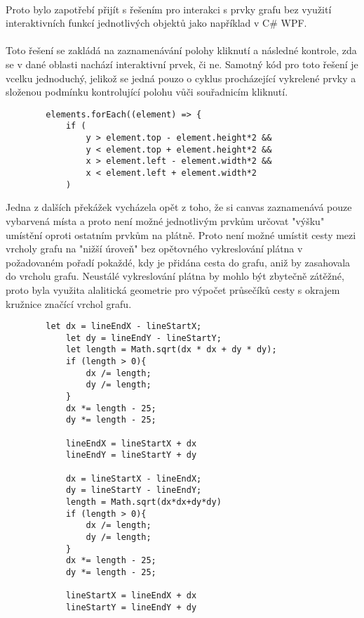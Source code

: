 \documentclass[12pt, titlepage, a4paper]{article}
\begin{document}
\paragraph{}
Proto bylo zapotřebí přijít s řešením pro interakci s prvky grafu bez využití
interaktivních funkcí jednotlivých objektů jako například v C\# WPF. \par
\paragraph{}
Toto řešení se zakládá na zaznamenávání polohy kliknutí a následné kontrole, zda
se v dané oblasti nachází interaktivní prvek, či ne. Samotný kód pro toto řešení
je vcelku jednoduchý, jelikož se jedná pouzo o cyklus procházející vykrelené prvky
a složenou podmínku kontrolující polohu vůči souřadnicím kliknutí. \par
\begin{lstlisting}
        elements.forEach((element) => {
            if (
                y > element.top - element.height*2 &&
                y < element.top + element.height*2 &&
                x > element.left - element.width*2 &&
                x < element.left + element.width*2
            )
    \end{lstlisting}

Jedna z dalších překážek vycházela opět z toho, že si canvas zaznamenává pouze
vybarvená místa a proto není možné jednotlivým prvkům určovat "výšku" \\ umístění
oproti ostatním prvkům na plátně. Proto není možné umístit cesty mezi vrcholy
grafu na "nižší úroveň" bez opětovného vykreslování plátna v požadovaném pořadí
pokaždé, kdy je přidána cesta do grafu, aniž by zasahovala do vrcholu grafu.
Neustálé vykreslování plátna by mohlo být zbytečně zátěžné, proto byla využita alalitická
geometrie pro výpočet průsečíků cesty s okrajem kružnice
značící vrchol grafu.\par
\begin{lstlisting}
        let dx = lineEndX - lineStartX;
            let dy = lineEndY - lineStartY;
            let length = Math.sqrt(dx * dx + dy * dy);
            if (length > 0){
                dx /= length;
                dy /= length;
            }
            dx *= length - 25;
            dy *= length - 25;

            lineEndX = lineStartX + dx
            lineEndY = lineStartY + dy

            dx = lineStartX - lineEndX;
            dy = lineStartY - lineEndY;
            length = Math.sqrt(dx*dx+dy*dy)
            if (length > 0){
                dx /= length;
                dy /= length;
            }
            dx *= length - 25;
            dy *= length - 25;

            lineStartX = lineEndX + dx
            lineStartY = lineEndY + dy
\end{lstlisting}
\end{document}
